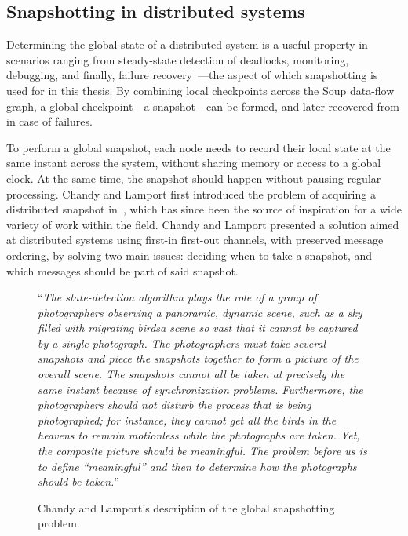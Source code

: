 \subsection{Snapshotting in distributed systems}\label{sec:rel-snapshotting}

Determining the global state of a distributed system is a useful property in
scenarios ranging from steady-state detection of deadlocks, monitoring,
debugging, and finally, failure recovery~\cite{intro-snapshot}---the aspect of
which snapshotting is used for in this thesis. By combining local checkpoints
across the Soup data-flow graph, a global checkpoint---a snapshot---can be
formed, and later recovered from in case of failures.

To perform a global snapshot, each node needs to record their local state at the
same instant across the system, without sharing memory or access to a global
clock. At the same time, the snapshot should happen without pausing regular
processing. Chandy and Lamport first introduced the problem of acquiring a
distributed snapshot in~\cite{chandy-lamport}, which has since been the source
of inspiration for a wide variety of work within the field. Chandy and Lamport
presented a solution aimed at distributed systems using first-in first-out
channels, with preserved message ordering, by solving two main issues: deciding
when to take a snapshot, and which messages should be part of said snapshot.

\begin{figure}
\begin{displayquote}
  ``\textit{The state-detection algorithm plays the role of a group of photographers
observing a panoramic, dynamic scene, such as a sky filled with migrating birdsa
scene so vast that it cannot be captured by a single photograph. The photographers
must take several snapshots and piece the snapshots together to form a
picture of the overall scene. The snapshots cannot all be taken at precisely the
same instant because of synchronization problems. Furthermore, the photographers
should not disturb the process that is being photographed; for instance,
they cannot get all the birds in the heavens to remain motionless while the
photographs are taken. Yet, the composite picture should be meaningful. The
problem before us is to define “meaningful” and then to determine how the
photographs should be taken.}''
\end{displayquote}
  \caption{Chandy and Lamport's description of the global snapshotting problem.}
\end{figure}

